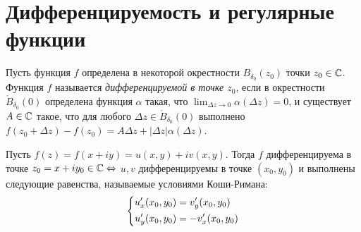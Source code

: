 \section{Дифференцируемость и регулярные функции}

\begin{definition}
	Пусть функция $f$ определена в некоторой окрестности $B_{\delta_0}(z_0)$ точки  $z_0 \in \mathbb{C}$. Функция $f$ называется \textit{дифференцируемой в точке $z_0$}, если в окрестности $\mathring B_{\delta_0}{(0)}$ определена функция $\alpha$ такая, что $\lim_{\Delta z \to 0}\alpha(\Delta z) = 0$, и существует $A \in \mathbb{C}$ такое, что для любого $\Delta z \in \mathring B_{\delta_0}{(0)}$ выполнено $f(z_0 + \Delta z) - f(z_0) = A\Delta z + |\Delta z|\alpha(\Delta z)$.
\end{definition}

\begin{theorem}
	Пусть $f(z) = f(x + iy) = u(x, y) + iv(x, y)$. Тогда $f$ дифференцируема в точке $z_0 = x + iy_0 \in \mathbb{C} \Leftrightarrow$ $u, v$ дифференцируемы в точке $(x_0, y_0)$ и выполнены следующие равенства, называемые условиями Коши-Римана:
	\[\left\{\begin{aligned}u'_x(x_0, y_0) &= v'_y(x_0, y_0) \\ u'_y(x_0, y_0) &= -v'_x(x_0, y_0)\end{aligned}\right.\]
\end{theorem}

